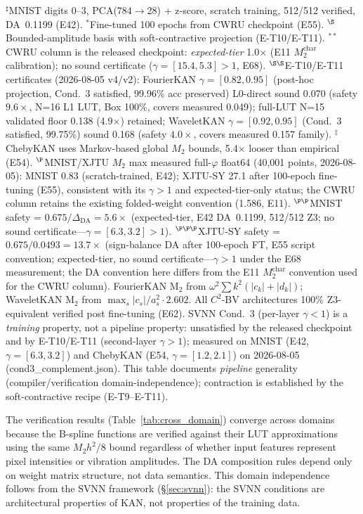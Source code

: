 \documentclass[journal,onecolumn]{IEEEtran}
\begin{document}
\begin{table}[tb]
\begin{tabular}{@{}lcccccc@{}}
\bottomrule
\end{tabular}
\vspace{2pt}
{\scriptsize
$^{\sharp}$MNIST digits 0--3, PCA(784$\to$28) + z-score, scratch training, 512/512 verified, DA~0.1199 (E42).
$^{*}$Fine-tuned 100 epochs from CWRU checkpoint (E55).
$^{\S}$Bounded-amplitude basis with soft-contractive projection (E-T10/E-T11).
$^{**}$CWRU column is the released checkpoint: \emph{expected-tier} 1.0$\times$ (E11 $M_2^{\text{char}}$ calibration); no sound certificate ($\gamma=[15.4,5.3]>1$, E68).
$^{\S\S}$E-T10/E-T11 certificates (2026-08-05 v4/v2): FourierKAN $\gamma=[0.82, 0.95]$ (post-hoc projection, Cond.~3 satisfied, 99.96\% acc preserved) L0-direct sound 0.070 (safety $9.6\times$, N=16 L1 LUT, Box 100\%, covers measured 0.049); full-LUT N=15 validated floor 0.138 (4.9$\times$) retained; WaveletKAN $\gamma=[0.92, 0.95]$ (Cond.~3 satisfied, 99.75\%) sound 0.168 (safety $4.0\times$, covers measured 0.157 family).
$^{\ddag}$ChebyKAN uses Markov-based global $M_2$ bounds, 5.4$\times$ looser than empirical (E54).
$^{\P}$MNIST/XJTU $M_2$ max measured full-$\varphi$ float64 (40{,}001 points, 2026-08-05): MNIST 0.83 (scratch-trained, E42); XJTU-SY 27.1 after 100-epoch fine-tuning (E55), consistent with its $\gamma>1$ and expected-tier-only status; the CWRU column retains the existing folded-weight convention (1.586, E11).
$^{\P\P}$MNIST safety = $0.675/\Delta_{\text{DA}} = 5.6\times$ (expected-tier, E42 DA~0.1199, 512/512 Z3; no sound certificate---$\gamma=[6.3,3.2]>1$).
$^{\P\P\P}$XJTU-SY safety = $0.675/0.0493 = 13.7\times$ (sign-balance DA after 100-epoch FT, E55 script convention; expected-tier, no sound certificate---$\gamma>1$ under the E68 measurement; the DA convention here differs from the E11 $M_2^{\text{char}}$ convention used for the CWRU column).
FourierKAN M$_2$ from $\omega^2\sum k^2(|c_k|+|d_k|)$; WaveletKAN M$_2$ from $\max_s|c_s|/a_s^2 \cdot 2.602$.
All $C^2$-BV architectures 100\% Z3-equivalent verified post fine-tuning (E62).
SVNN Cond.~3 (per-layer $\gamma<1$) is a \emph{training} property, not a pipeline property: unsatisfied by the released checkpoint and by E-T10/E-T11 (second-layer $\gamma>1$); measured on MNIST (E42, $\gamma=[6.3,3.2]$) and ChebyKAN (E54, $\gamma=[1.2,2.1]$) on 2026-08-05 (cond3\_complement.json). This table documents \emph{pipeline} generality (compiler/verification domain-independence); contraction is established by the soft-contractive recipe (E-T9--E-T11).}
\end{table}

The verification results (Table~\ref{tab:cross_domain}) converge across domains because the
B-spline functions are verified against their LUT approximations using the
same $M_2 h^2/8$ bound regardless of whether input features represent pixel
intensities or vibration amplitudes. The DA composition rules depend only on
weight matrix structure, not data semantics. This domain independence follows
from the SVNN framework ({\S}\ref{sec:svnn}): the SVNN conditions
are architectural properties of KAN, not properties of the training data.
\end{document}
